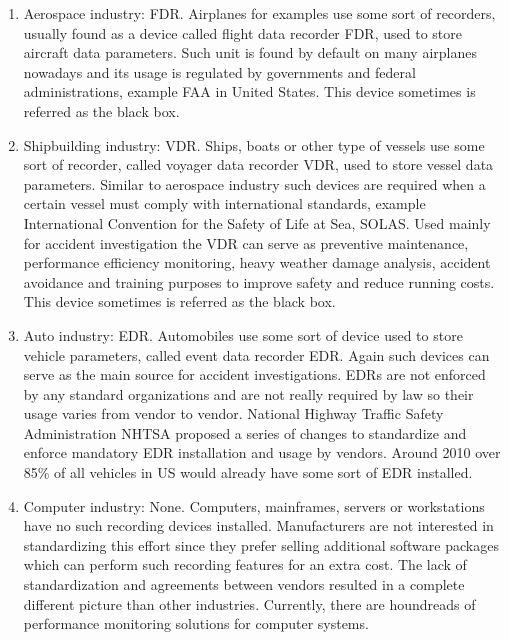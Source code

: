 \begin{enumerate}
\item Aerospace industry: FDR. Airplanes for examples use some sort of 
recorders, usually found as a device called flight data recorder FDR, 
used to store aircraft data parameters. Such unit is found by default 
on many airplanes nowadays and its usage is regulated by governments and 
federal administrations, example FAA in United States. This device sometimes
is referred as the black box.

\item Shipbuilding industry: VDR. Ships, boats or other type of vessels 
use some sort of recorder, called voyager data recorder VDR, used to 
store vessel data parameters. Similar to aerospace industry such devices 
are required when a certain vessel must comply with international 
standards, example International Convention for the Safety of Life 
at Sea, SOLAS. Used mainly for accident investigation the VDR can serve 
as preventive maintenance, performance efficiency monitoring, heavy weather 
damage analysis, accident avoidance and training purposes to improve 
safety and reduce running costs. This device sometimes is referred as the 
black box.

\item Auto industry: EDR. Automobiles use some sort of device used to store 
vehicle parameters, called event data recorder EDR. Again such devices can 
serve as the main source for accident investigations. EDRs are not enforced 
by any standard organizations and are not really required by law so their 
usage varies from vendor to vendor. National Highway Traffic Safety 
Administration NHTSA proposed a series of changes to standardize and enforce 
mandatory EDR installation and usage by vendors. Around 2010 over 
85\% of all vehicles in US would already have some sort of EDR installed.

\item Computer industry: None. Computers, mainframes, servers or workstations 
have no such recording devices installed. Manufacturers are not interested in 
standardizing this effort since they prefer selling additional software 
packages which can perform such recording features for an extra cost. 
The lack of standardization and agreements between vendors resulted 
in a complete different picture than other industries. Currently, there are 
houndreads of performance monitoring solutions for computer systems.
\end{enumerate}

